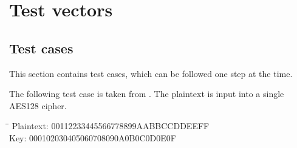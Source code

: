 \chapter{Test vectors}

\arraycolsep=0pt

\section*{Test cases}
This section contains test cases, which can be followed one step at 
the time.

The following test case is taken from \citet[pp. 35--36]{AES:2001}. 
The plaintext is input into a single AES128 cipher. \\

\begin{tabbing}
  \hspace*{3cm}\=\hspace*{3cm}\= \kill
  Plaintext: \> 00112233445566778899AABBCCDDEEFF \\
  Key: \> 000102030405060708090A0B0C0D0E0F \\
\end{tabbing}

